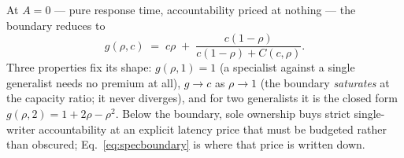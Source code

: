 \documentclass[11pt,a4paper]{article}
\theoremstyle{definition}
\theoremstyle{plain}
\begin{document}
At $A=0$ --- pure response time, accountability priced at nothing --- the boundary
reduces to
\begin{equation}\label{eq:specboundary0}
g(\rho,c) \;=\; c\rho \;+\; \frac{c(1-\rho)}{c(1-\rho)+C(c,\rho)}.
\end{equation}
Three properties fix its shape: $g(\rho,1)=1$ (a specialist against a single
generalist needs no premium at all), $g\to c$ as $\rho\to1$ (the boundary
\emph{saturates} at the capacity ratio; it never diverges), and for two generalists
it is the closed form $g(\rho,2)=1+2\rho-\rho^2$. Below the boundary, sole
ownership buys strict single-writer accountability at an explicit latency price
that must be budgeted rather than obscured; Eq.~\ref{eq:specboundary} is where that
price is written down.

\end{document}
